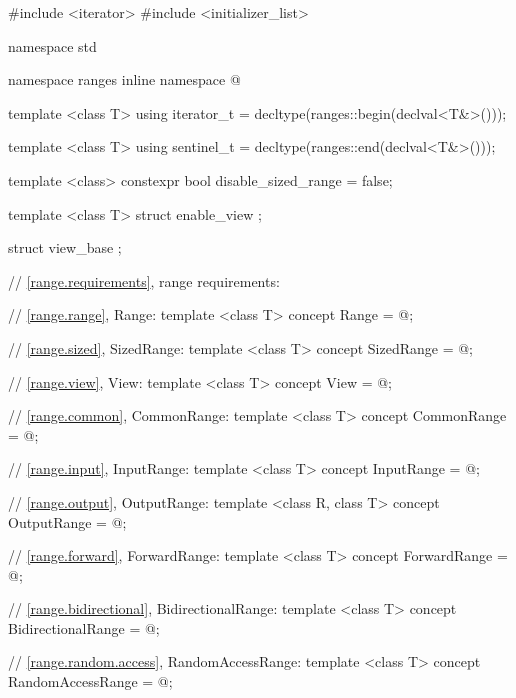%
\begin{codeblock}
#include <iterator>
#include <initializer_list>

namespace std {
  namespace ranges {
    inline namespace @
  }

  template <class T>
  using iterator_t = decltype(ranges::begin(declval<T&>()));

  template <class T>
  using sentinel_t = decltype(ranges::end(declval<T&>()));

  template <class>
  constexpr bool disable_sized_range = false;

  template <class T>
  struct enable_view { };

  struct view_base { };

  // \ref{range.requirements}, range requirements:

  // \ref{range.range}, Range:
  template <class T>
  concept Range = @\seebelow@;

  // \ref{range.sized}, SizedRange:
  template <class T>
  concept SizedRange = @\seebelow@;

  // \ref{range.view}, View:
  template <class T>
  concept View = @\seebelow@;

  // \ref{range.common}, CommonRange:
  template <class T>
  concept CommonRange = @\seebelow@;

  // \ref{range.input}, InputRange:
  template <class T>
  concept InputRange = @\seebelow@;

  // \ref{range.output}, OutputRange:
  template <class R, class T>
  concept OutputRange = @\seebelow@;

  // \ref{range.forward}, ForwardRange:
  template <class T>
  concept ForwardRange = @\seebelow@;

  // \ref{range.bidirectional}, BidirectionalRange:
  template <class T>
  concept BidirectionalRange = @\seebelow@;

  // \ref{range.random.access}, RandomAccessRange:
  template <class T>
  concept RandomAccessRange = @\seebelow@;
}
\end{codeblock}

